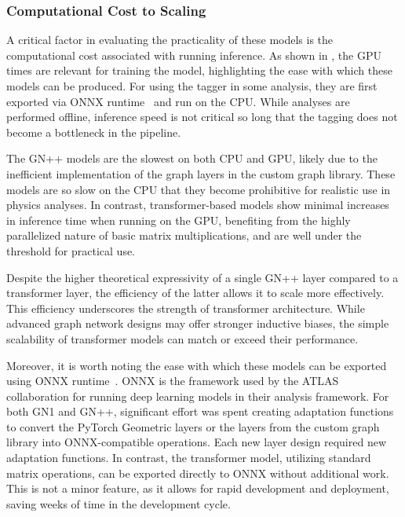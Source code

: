 \FloatBarrier

\subsubsection{Computational Cost to Scaling}

A critical factor in evaluating the practicality of these models is the computational cost associated with running inference.
As shown in , the GPU times are relevant for training the model, highlighting the ease with which these models can be produced. For using the tagger in some analysis, they are first exported via ONNX runtime~\cite{onnxruntime} and run on the CPU\@.
While analyses are performed offline, inference speed is not critical so long that the tagging does not become a bottleneck in the pipeline.

The GN++ models are the slowest on both CPU and GPU, likely due to the inefficient implementation of the graph layers in the custom graph library.
These models are so slow on the CPU that they become prohibitive for realistic use in physics analyses.
In contrast, transformer-based models show minimal increases in inference time when running on the GPU, benefiting from the highly parallelized nature of basic matrix multiplications, and are well under the threshold for practical use.

Despite the higher theoretical expressivity of a single GN++ layer compared to a transformer layer, the efficiency of the latter allows it to scale more effectively.
This efficiency underscores the strength of transformer architecture.
While advanced graph network designs may offer stronger inductive biases, the simple scalability of transformer models can match or exceed their performance.

Moreover, it is worth noting the ease with which these models can be exported using ONNX runtime~\cite{onnxruntime}.
ONNX is the framework used by the ATLAS collaboration for running deep learning models in their analysis framework.
For both GN1 and GN++, significant effort was spent creating adaptation functions to convert the PyTorch Geometric layers or the layers from the custom graph library into ONNX-compatible operations.
Each new layer design required new adaptation functions.
In contrast, the transformer model, utilizing standard matrix operations, can be exported directly to ONNX without additional work.
This is not a minor feature, as it allows for rapid development and deployment, saving weeks of time in the development cycle.

